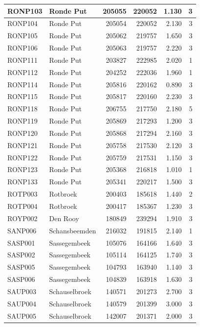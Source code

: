 \documentclass[11pt,]{book}
\begin{document}
\begin{table}
\begin{tabular}[t]{l|l|r|r|r|r}
\hline
RONP103 & Ronde Put & 205055 & 220052 & 1.130 & 3\\
\hline
RONP104 & Ronde Put & 205054 & 220052 & 2.130 & 3\\
\hline
RONP105 & Ronde Put & 205062 & 219757 & 1.650 & 3\\
\hline
RONP106 & Ronde Put & 205063 & 219757 & 2.220 & 3\\
\hline
RONP111 & Ronde Put & 203827 & 222985 & 2.020 & 1\\
\hline
RONP112 & Ronde Put & 204252 & 222036 & 1.960 & 1\\
\hline
RONP114 & Ronde Put & 205816 & 220162 & 0.890 & 3\\
\hline
RONP115 & Ronde Put & 205817 & 220160 & 2.230 & 3\\
\hline
RONP118 & Ronde Put & 206755 & 217750 & 2.180 & 5\\
\hline
RONP119 & Ronde Put & 205869 & 217293 & 1.200 & 3\\
\hline
RONP120 & Ronde Put & 205868 & 217294 & 2.160 & 3\\
\hline
RONP121 & Ronde Put & 205758 & 217530 & 2.120 & 3\\
\hline
RONP122 & Ronde Put & 205759 & 217531 & 1.150 & 3\\
\hline
RONP123 & Ronde Put & 205368 & 216818 & 1.010 & 1\\
\hline
RONP133 & Ronde Put & 205341 & 220217 & 1.500 & 3\\
\hline
ROTP003 & Rotbroek & 200403 & 185618 & 1.440 & 2\\
\hline
ROTP004 & Rotbroek & 200417 & 185367 & 1.230 & 3\\
\hline
ROYP002 & Den Rooy & 180849 & 239294 & 1.910 & 3\\
\hline
SANP006 & Schansbeemden & 216032 & 191815 & 2.140 & 1\\
\hline
SASP001 & Sassegembeek & 105076 & 164166 & 1.640 & 3\\
\hline
SASP002 & Sassegembeek & 105114 & 164125 & 1.740 & 3\\
\hline
SASP005 & Sassegembeek & 104793 & 163940 & 1.140 & 3\\
\hline
SASP006 & Sassegembeek & 104839 & 163918 & 1.630 & 3\\
\hline
SAUP003 & Schauselbroek & 140571 & 201273 & 2.700 & 3\\
\hline
SAUP004 & Schauselbroek & 140579 & 201399 & 3.000 & 3\\
\hline
SAUP005 & Schauselbroek & 142007 & 201371 & 2.000 & 3\\
\hline

\end{tabular}
\end{table}
\end{document}
